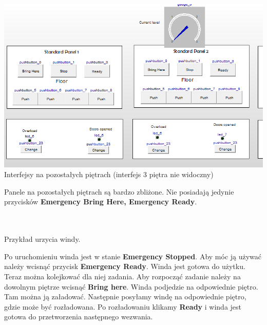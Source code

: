 \documentclass[a4paper,11pt]{article}
\begin{document}
    		\includegraphics{images/rGuiStd.PNG} Interfejsy na pozostałych piętrach (interfejs 3 piętra nie widoczny)
  	
  	
  	Panele na pozostałych piętrach są bardzo zbliżone. Nie posiadają jedynie przycisków \textbf{Emergency Bring Here, Emergency Ready}.
  	
  	
  	\\
  	\\
  	Przykład urzycia windy.
  	
  	Po uruchomieniu winda jest w stanie \textbf{Emergency Stopped}. Aby móc ją używać należy wcisnąć przycisk \textbf{Emergency Ready}.
  	Winda jest gotowa do użytku. Teraz można kolejkować dla niej zadania.
  	Aby rozpocząć zadanie należy na dowolnym piętrze wcisnąć \textbf{Bring here}. Winda podjedzie na odpowiednie piętro.
  	Tam można ją załadować. Następnie posyłamy windę na odpowiednie piętro, gdzie może być rozładowana. 
  	Po rozładowaniu klikamy \textbf{Ready} i winda jest gotowa do przetworzenia następnego wezwania.

    
\end{document}
